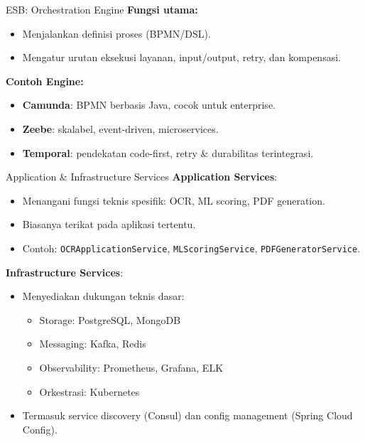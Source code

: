 \documentclass[aspectratio=169, table]{beamer}
\begin{document}
\begin{frame}[fragile]{ESB: Orchestration Engine}
	\textbf{Fungsi utama:}
	\begin{itemize}
		\item Menjalankan definisi proses (BPMN/DSL).
		\item Mengatur urutan eksekusi layanan, input/output, retry, dan kompensasi.
	\end{itemize}
	
	\vspace{4pt}
	\textbf{Contoh Engine:}
	\begin{itemize}
		\item \textbf{Camunda}: BPMN berbasis Java, cocok untuk enterprise.
		\item \textbf{Zeebe}: skalabel, event-driven, microservices.
		\item \textbf{Temporal}: pendekatan code-first, retry \& durabilitas terintegrasi.
	\end{itemize}
\end{frame}
\begin{frame}[fragile]{Application \& Infrastructure Services}
	\textbf{Application Services}:
	\begin{itemize}
		\item Menangani fungsi teknis spesifik: OCR, ML scoring, PDF generation.
		\item Biasanya terikat pada aplikasi tertentu.
		\item Contoh: \texttt{OCRApplicationService}, \texttt{MLScoringService}, \texttt{PDFGeneratorService}.
	\end{itemize}
	
	\vspace{4pt}
	\textbf{Infrastructure Services}:
	\begin{itemize}
		\item Menyediakan dukungan teknis dasar:
		\begin{itemize}
			\item Storage: PostgreSQL, MongoDB
			\item Messaging: Kafka, Redis
			\item Observability: Prometheus, Grafana, ELK
			\item Orkestrasi: Kubernetes
		\end{itemize}
		\item Termasuk service discovery (Consul) dan config management (Spring Cloud Config).
	\end{itemize}
\end{frame}
\end{document}
